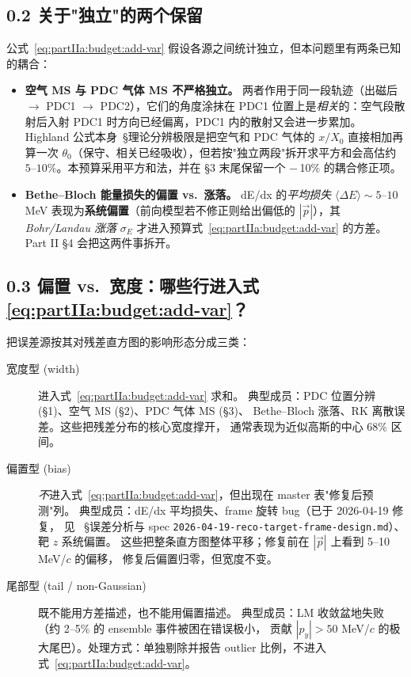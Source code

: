 \subsection*{0.2 关于"独立"的两个保留}

公式~\eqref{eq:partIIa:budget:add-var} 假设各源之间统计独立，但本问题里有两条已知的耦合：
\begin{itemize}
  \item \textbf{空气 MS 与 PDC 气体 MS 不严格独立。} 两者作用于同一段轨迹（出磁后 $\to$ PDC1 $\to$ PDC2），它们的角度涂抹在 PDC1 位置上是\emph{相关}的：空气段散射后入射 PDC1 时方向已经偏离，PDC1 内的散射又会进一步累加。Highland 公式本身\StatusReport{}~§理论分辨极限是把空气和 PDC 气体的 $x/X_0$ 直接相加再算一次 $\theta_0$（保守、相关已经吸收），但若按"独立两段"拆开求平方和会高估约 $5\text{--}10\%$。本预算采用平方和法，并在 §3 末尾保留一个 $-\,$10\% 的耦合修正项。
  \item \textbf{Bethe--Bloch 能量损失的偏置 vs.~涨落。} dE/dx 的\emph{平均损失} $\langle\Delta E\rangle\sim 5$--$10$ MeV 表现为\textbf{系统偏置}（前向模型若不修正则给出偏低的 $|\vec p|$），其\emph{Bohr/Landau 涨落} $\sigma_E$ 才进入预算式~\eqref{eq:partIIa:budget:add-var} 的方差。Part II §4 会把这两件事拆开。
\end{itemize}

\subsection*{0.3 偏置 vs.~宽度：哪些行进入式 \eqref{eq:partIIa:budget:add-var}？}

把误差源按其对残差直方图的影响形态分成三类：
\begin{description}
  \item[宽度型 (width)] 进入式~\eqref{eq:partIIa:budget:add-var} 求和。
        典型成员：PDC 位置分辨 (§1)、空气 MS (§2)、PDC 气体 MS (§3)、
        Bethe--Bloch 涨落、RK 离散误差。这些把残差分布的核心宽度撑开，
        通常表现为近似高斯的中心 68\% 区间。
  \item[偏置型 (bias)] \emph{不}进入式~\eqref{eq:partIIa:budget:add-var}，但出现在 master 表"修复后预测"列。
        典型成员：dE/dx 平均损失、frame 旋转 bug（已于 2026-04-19 修复，
        见 \StatusReport{}~§误差分析与 spec
        \texttt{2026-04-19-reco-target-frame-design.md}）、靶 $z$ 系统偏置。
        这些把整条直方图整体平移；修复前在 $|\vec p|$ 上看到 5--10 MeV/$c$ 的偏移，
        修复后偏置归零，但宽度不变。
  \item[尾部型 (tail / non-Gaussian)] 既不能用方差描述，也不能用偏置描述。
        典型成员：LM 收敛盆地失败（约 2--5\% 的 ensemble 事件被困在错误极小，
        贡献 $|p_y|>50$ MeV/$c$ 的极大尾巴）。处理方式：单独剔除并报告 outlier
        比例，不进入式~\eqref{eq:partIIa:budget:add-var}。
\end{description}

